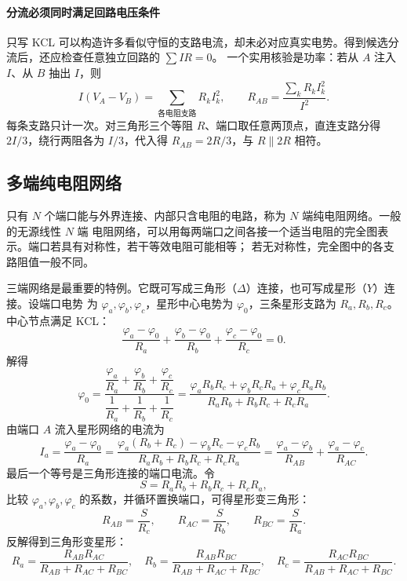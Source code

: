 {%
\paragraph{分流必须同时满足回路电压条件}
只写 KCL 可以构造许多看似守恒的支路电流，却未必对应真实电势。得到候选分流后，还应检查任意独立回路的 $\sum IR=0$。
一个实用核验是功率：若从 $A$ 注入 $I$、从 $B$ 抽出 $I$，则
\[
 I(V_A-V_B)=\sum_{\text{各电阻支路}}R_kI_k^2,
 \qquad R_{AB}=\frac{\sum_kR_kI_k^2}{I^2}.
\]
每条支路只计一次。对三角形三个等阻 $R$、端口取任意两顶点，直连支路分得 $2I/3$，绕行两阻各为 $I/3$，代入得 $R_{AB}=2R/3$，与 $R\parallel2R$ 相符。


\subsection{多端纯电阻网络}


只有 $N$ 个端口能与外界连接、内部只含电阻的电路，称为 $N$ 端纯电阻网络。一般的无源线性 $N$ 端
电阻网络，可以用每两端口之间各接一个适当电阻的完全图表示。端口若具有对称性，若干等效电阻可能相等；
若无对称性，完全图中的各支路阻值一般不同。

三端网络是最重要的特例。它既可写成三角形（$\Delta$）连接，也可写成星形（$Y$）连接。设端口电势
为 $\varphi_a,\varphi_b,\varphi_c$，星形中心电势为 $\varphi_0$，三条星形支路为 $R_a,R_b,R_c$。
中心节点满足 KCL：
\begin{equation}
  \frac{\varphi_a-\varphi_0}{R_a}
  +\frac{\varphi_b-\varphi_0}{R_b}
  +\frac{\varphi_c-\varphi_0}{R_c}=0.
\end{equation}
解得
\begin{equation}
  \varphi_0=
  \frac{\dfrac{\varphi_a}{R_a}+\dfrac{\varphi_b}{R_b}+\dfrac{\varphi_c}{R_c}}
       {\dfrac1{R_a}+\dfrac1{R_b}+\dfrac1{R_c}}
  =\frac{\varphi_aR_bR_c+\varphi_bR_cR_a+\varphi_cR_aR_b}
  {R_aR_b+R_bR_c+R_cR_a}.
\end{equation}
由端口 $A$ 流入星形网络的电流为
\begin{equation}
  I_a=\frac{\varphi_a-\varphi_0}{R_a}
  =\frac{\varphi_a(R_b+R_c)-\varphi_bR_c-\varphi_cR_b}
  {R_aR_b+R_bR_c+R_cR_a}
  =\frac{\varphi_a-\varphi_b}{R_{AB}}
  +\frac{\varphi_a-\varphi_c}{R_{AC}}.
\end{equation}
最后一个等号是三角形连接的端口电流。令
\[
  S=R_aR_b+R_bR_c+R_cR_a,
\]
比较 $\varphi_a,\varphi_b,\varphi_c$ 的系数，并循环置换端口，可得星形变三角形：
\[
  \boxed{R_{AB}=\frac{S}{R_c},\qquad
  R_{AC}=\frac{S}{R_b},\qquad
  R_{BC}=\frac{S}{R_a}}.
\]
反解得到三角形变星形：
\[
\boxed{
  R_a=\frac{R_{AB}R_{AC}}{R_{AB}+R_{AC}+R_{BC}},\quad
  R_b=\frac{R_{AB}R_{BC}}{R_{AB}+R_{AC}+R_{BC}},\quad
  R_c=\frac{R_{AC}R_{BC}}{R_{AB}+R_{AC}+R_{BC}}.}
\]

}
